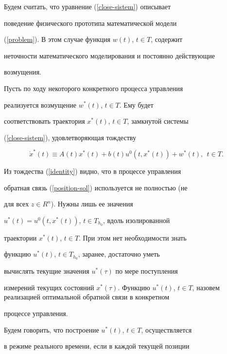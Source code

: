 Будем считать, что уравнение (\ref{close-sistem}) описывает


поведение физического прототипа математической модели


(\ref{problem}). В этом случае функция $w(t)$, $t\in T$, содержит


неточности математического моделирования и постоянно действующие


возмущения.





Пусть по ходу некоторого конкретного процесса управления


реализуется возмущение $w^*(t)$, $t\in T$. Ему будет


соответствовать траектория $x^*(t)$, $t\in T$, замкнутой системы


(\ref{close-sistem}), удовлетворяющая тождеству


\begin{equation}\label{identity}


\Dot{x}^*(t)\equiv A(t)x^*(t)+b(t)u^0(t,x^*(t))+w^*(t),\ \ t\in T.


\end{equation}





Из тождества (\ref{identity}) видно, что в процессе управления


обратная связь (\ref{position-sol}) используется не полностью (не


для всех $z\in R^n$). Нужны лишь ее значения


$u^*(t)=u^0(t,x^*(t))$, $t\in T_{h_0}$, вдоль изолированной


траектории $x^*(t)$, $t\in T$. При этом нет необходимости знать


функцию $u^*(t)$, $t\in T_{h_0}$, заранее, достаточно уметь


вычислять текущие значения $u^*(\tau)$ по мере поступления


измерений текущих состояний $x^*(\tau)$. Функцию $u^*(t)$, $t\in


T$, назовем реализацией оптимальной обратной связи в конкретном


процессе управления.





Будем говорить, что построение $u^*(t)$, $t\in T$, осуществляется


в режиме реального времени, если в каждой текущей позиции


